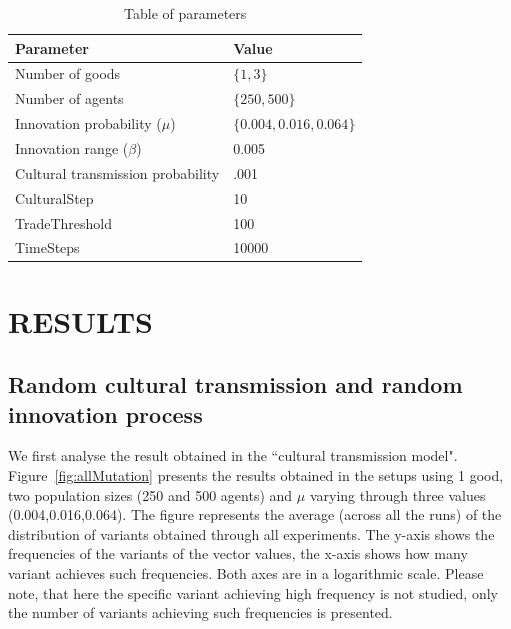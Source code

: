 \documentclass{wscpaperproc}
\begin{document}

\begin{table}
\begin{center}
\begin{tabular}{@{}ll@{}}
\toprule
Parameter & Value \\
\midrule
Number of goods & $\{1,3\}$ \\
Number of agents & $\{250,500\}$ \\
Innovation probability ($\mu$) & $\{0.004,0.016,0.064\}$ \\
Innovation range ($\beta$) & 0.005\\
Cultural transmission probability & .001\\
CulturalStep &  10 \\
TradeThreshold & 100  \\
TimeSteps & 10000 \\
\bottomrule
\end{tabular}
\caption{Table of parameters}\label{tab:parameters}
\end{center}
\end{table}






\section{RESULTS}
\subsection{Random cultural transmission and random innovation process}

We first analyse the result obtained in the ``cultural transmission model". Figure~\ref{fig:allMutation} presents the results obtained in the setups using 1 good, two population sizes (250 and 500 agents) and $\mu$ varying through three values (0.004,0.016,0.064). The figure represents the average (across all the runs) of the distribution of variants obtained through all experiments. The y-axis shows the frequencies of the variants of the vector values, the x-axis shows how many variant achieves such frequencies. Both axes are in a logarithmic scale. Please note, that here the specific variant achieving high frequency is not studied, only the number of variants achieving such frequencies is presented.
\end{document}
